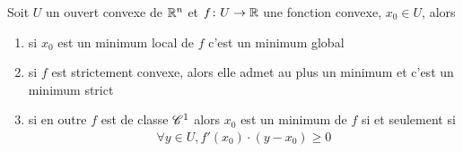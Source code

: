 \documentclass[french,a4paper,10pt]{article}
\begin{document}
	\begin{oc-theorem}
		Soit $U$ un ouvert convexe de $\mathbb{R}^n$ et $f\colon U\to\mathbb{R}$ une fonction convexe, $x_0\in U$, alors
			\begin{enumerate}[label=$(\roman*)$]
				\item si $x_0$ est un minimum local de $f$ c'est un minimum global
				
				\item si $f$ est strictement convexe, alors elle admet au plus un minimum et c'est un minimum strict
				
				\item si en outre $f$ est de classe $\mathscr{C}^1$ alors $x_0$ est un minimum de $f$ si et seulement si 
					\[\begin{aligned}
						\forall y\in U,f'(x_0)\cdot(y-x_0)\ge 0
					\end{aligned}\]
			\end{enumerate}
	\end{oc-theorem}
	
\end{document}
